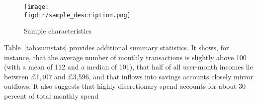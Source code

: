 \begin{figure}[H]
    \centering
    \caption{Sample characteristics}
    \texttt{[image: \\figdir/sample\_description.png]}
    \label{fig:sample_description}
\end{figure}

Table~\ref{tab:sumstats} provides additional summary statistics. It shows, for
instance, that the average number of monthly transactions is slightly above 100
(with a mean of 112 and a median of 101), that half of all user-month incomes
lie between \pounds1,407 and \pounds3,596, and that inflows into savings
accounts closely mirror outflows. It also suggests that highly discretionary
spend accounts for about 30 percent of total monthly spend




